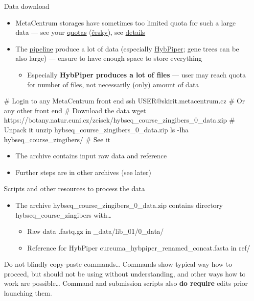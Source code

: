 \documentclass[compress,  xelatex, 11pt, xcolor=x11names, aspectratio=169,
	hyperref={
		bookmarks=true,
		unicode=true,
		colorlinks=true,
		pdftitle={HybSeq course},
		plainpages=false,
		pdfauthor={Vojtech Zeisek},
		pdfsubject={Practical processing of HybSeq target enrichment sequencing data on computing grids like MetaCentrum},
		pdfcreator={XeLaTeX},
		pdfkeywords={BASH, command line, GNU, HybSeq, Linux, MetaCentrum, sequencing shell, target enrichment},
		linkcolor=Turquoise4, %
		anchorcolor=DodgerBlue4, %
		citecolor=DodgerBlue4, %
		filecolor=DodgerBlue4, %
		menucolor=Tan4, %
		urlcolor=DarkOliveGreen4 %
		},
	url={hyphens, lowtilde} %
	]{beamer}
\renewcommand{\texttt}[1]{\colorbox{Cornsilk2}{{\ttfamily #1}}}
\renewcommand{\alert}[1]{\textcolor{OrangeRed3}{#1}}
\begin{document}
\begin{frame}[fragile]{Data download}
	\label{datadownload}
	\begin{itemize}
		\item MetaCentrum storages have sometimes too limited quota for such a large data --- see your \href{https://metavo.metacentrum.cz/en/myaccount/kvoty}{quotas} (\href{http://metavo.metacentrum.cz/cs/myaccount/kvoty}{česky}), see \href{https://docs.metacentrum.cz/en/docs/data/quotas}{details}
		\item The \href{https://github.com/V-Z/hybseq-scripts}{pipeline} produce a lot of data (especially \href{https://github.com/mossmatters/HybPiper/}{HybPiper}; gene trees can be also large) --- ensure to have enough space to store everything
		\begin{itemize}
			\item Especially \textbf{HybPiper produces a lot of files} --- \alert{user may reach quota for number of files}, not necessarily (only) amount of data
		\end{itemize}
	\end{itemize}
	\begin{bashcode}
    # Login to any MetaCentrum front end
    ssh USER@skirit.metacentrum.cz # Or any other front end
    # Download the data
    wget https://botany.natur.cuni.cz/zeisek/hybseq_course_zingibers_0_data.zip
    # Unpack it
    unzip hybseq_course_zingibers_0_data.zip
    ls -lha hybseq_course_zingibers/ # See it
	\end{bashcode}
	\begin{itemize}
		 \item The archive contains input raw data and reference
		 \item Further steps are in other archives (see later)
	\end{itemize}
\end{frame}

\begin{frame}{Scripts and other resources to process the data}
	\begin{itemize}
		\item The archive \texttt{hybseq\_course\_zingibers\_0\_data.zip} contains directory \texttt{hybseq\_course\_zingibers} with\ldots
		\begin{itemize}
			\item Raw data \texttt{*.fastq.gz} in \texttt{1\_data/lib\_01/0\_data/}
			\item Reference for HybPiper \texttt{curcuma\_hybpiper\_renamed\_concat.fasta} in \texttt{ref/}
		\end{itemize}
	\end{itemize}
	\begin{alertblock}{Do not blindly copy-paste commands\ldots}
		\alert{Commands show typical way how to proceed, but should not be using without understanding, and other ways how to work are possible\ldots}{ }Command and submission scripts also \textbf{do require} edits prior launching them.
	\end{alertblock}
\end{frame}
\end{document}
